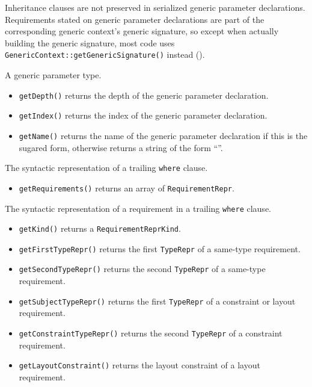 \documentclass[../generics]{subfiles}
\begin{document}
Inheritance clauses are not preserved in serialized generic parameter declarations. Requirements stated on generic parameter declarations are part of the corresponding generic context's generic signature, so except when actually building the generic signature, most code uses \texttt{GenericContext::getGenericSignature()} instead ().

A generic parameter type.
\begin{itemize}
\item \texttt{getDepth()} returns the depth of the generic parameter declaration.
\item \texttt{getIndex()} returns the index of the generic parameter declaration.
\item \texttt{getName()} returns the name of the generic parameter declaration if this is the sugared form, otherwise returns a string of the form ``''.
\end{itemize}

The syntactic representation of a trailing \texttt{where} clause.
\begin{itemize}
\item \texttt{getRequirements()} returns an array of \texttt{RequirementRepr}.
\end{itemize}

The syntactic representation of a requirement in a trailing \texttt{where} clause.
\begin{itemize}
\item \texttt{getKind()} returns a \texttt{RequirementReprKind}.
\item \texttt{getFirstTypeRepr()} returns the first \texttt{TypeRepr} of a same-type requirement.
\item \texttt{getSecondTypeRepr()} returns the second \texttt{TypeRepr} of a same-type requirement.
\item \texttt{getSubjectTypeRepr()} returns the first \texttt{TypeRepr} of a constraint or layout requirement.
\item \texttt{getConstraintTypeRepr()} returns the second \texttt{TypeRepr} of a constraint requirement.
\item \texttt{getLayoutConstraint()} returns the layout constraint of a layout requirement.
\end{itemize}
\end{document}
